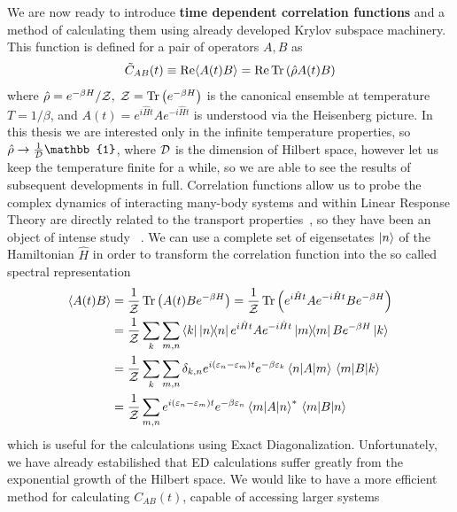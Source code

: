 We are now ready to introduce \textbf{time dependent correlation functions} and a method of calculating them using already
developed Krylov subspace machinery. This function is defined for a pair of operators \(A,B\) as
\begin{equation}
\tilde{C}_{AB}(t) \equiv \Re \langle A(t) B \rangle = \Re \Tr\left(\hat{\rho}A(t)B\right)
\end{equation}
where \(\hat{\rho} = e^{-\beta H}/\mathcal{Z},\; \mathcal{Z} = \Tr\left(e^{-\beta H}\right)\) is the canonical ensemble at temperature \(T = 1/\beta\),
and \(A(t) = e^{i \hat{H} t} A e^{-i \hat{H} t}\) is understood via the Heisenberg picture. In this thesis we are
interested only in the infinite temperature properties, so \(\hat{\rho} \to \frac{1}{\dimension} \mathbb{1}\), where \(\mathcal{D}\) is 
the dimension of Hilbert space, however let us keep the temperature finite for a while, so we are able to see the results of subsequent
developments in full. Correlation functions allow us to probe the complex dynamics of interacting many-body
systems and within Linear Response Theory are directly related to the transport properties~\autocite{Mahan2000}, so
they have been an object of intense study
~\autocite{Steinigeweg2014,Sirker2009,Steinigeweg2009,Karrasch2013a,Karrasch2012,Steinigeweg2015,Richter2019}.
We can use a complete set of eigensetates \(\ket{n}\) of the Hamiltonian \(\hat{H}\) in order to transform
the correlation function into the so called spectral representation
\begin{align}
	\langle A(t) B \rangle &=  \frac{1}{\mathcal{Z}}\Tr\left(A(t)B e^{-\beta H}\right) = \frac{1}{\mathcal{Z}}\Tr\left(e^{i \hat{H} t} A e^{-i \hat{H} t}B e^{-\beta H}\right)\nonumber\\
	&= \frac{1}{\mathcal{Z}} \sum_k \sum_{m,n} \bra{k} \ketbra{n}{n} e^{i \hat{H} t} A e^{-i \hat{H} t} \ketbra{m}{m} B e^{-\beta H} \ket{k}  \nonumber \\
	&= \frac{1}{\mathcal{Z}} \sum_k \sum_{m,n} \delta_{k,n} e^{i (\varepsilon_n  - \varepsilon_m) t} e^{-\beta \varepsilon_k} \matrixel{n}{A}{m} \matrixel{m}{B}{k} \nonumber \\
	&= \frac{1}{\mathcal{Z}} \sum_{m,n} e^{i (\varepsilon_n  - \varepsilon_m) t} e^{-\beta \varepsilon_n}\matrixel{m}{A}{n}^{\ast} \matrixel{m}{B}{n}
\end{align}
which is useful for the calculations using Exact Diagonalization. Unfortunately, we have already estabilished that ED calculations
suffer greatly from the exponential growth of the Hilbert space.
We would like to have a more efficient method for calculating \(C_{AB}(t)\), capable of accessing larger systems
